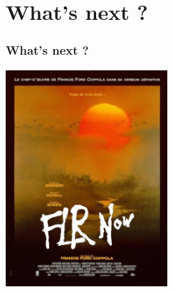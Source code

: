 \documentclass{beamer}%
\begin{document}
\section{What's next ?}
\begin{frame}
   \frametitle{What's next ?}
	\begin{center}
		\includegraphics[width=0.45\textwidth]{flr30.jpg}
	\end{center}
\end{frame}
\end{document}
